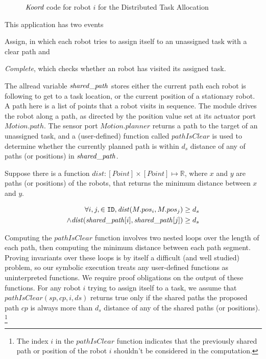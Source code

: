 \begin{figure}[t]
    {
    
    }
    {
    
    }
    \caption{ $\emph{Koord}$ code for robot $i$ for the Distributed Task Allocation}
    \label{fig:taskapp }
\end{figure}


This application has two events \begin{inparaenum} \item {Assign}, in which each robot tries to assign itself to an unassigned task with a clear path  and \item \emph{Complete}, which checks whether an robot has visited its assigned task. \end{inparaenum} The allread variable $\mathit{shared\_path}$ stores either the current path each robot is following to get to a task location, or the current position of a stationary robot. A path here is a list of points that a robot visits in sequence. The \Motion module drives the robot along a path, as directed by the position value set at its actuator port $\mathit{Motion.path}$. The sensor port $\mathit{Motion.planner}$ returns a path to the target of an unassigned task, and a (user-defined) function called $\mathit{pathIsClear}$ is used to determine whether the currently planned path is within $d_s$ distance of any of paths (or positions) in $\mathit{shared\_path}$.

\newcommand{\dist}{\mathit{dist}}
Suppose there is a function $\dist : [Point] \times [Point] \mapsto \mathbb{R}$, where $x$ and $y$ are paths (or positions) of the robots, that returns the minimum distance between $x$ and $y$.
\begin{invariant}
\label{inv:task}
\[\begin{split}
    \forall i,j, \in \UINS, \dist(M.pos_i, M.pos_j) \geq d_s \\ \land \dist(\pathvar[i], \pathvar[j]) \geq d_s
\end{split}
\]
\end{invariant}
\noindent

Computing the $\mathit{pathIsClear}$ function involves two nested loops over the length of each path, then computing the minimum distance between each path segment. Proving invariants over these loops is by itself a difficult (and well studied) problem, so our symbolic execution treats any user-defined functions as uninterpreted functions. We require proof obligations on the output of these functions. For any robot $i$ trying to assign itself to a task, we  assume that $\mathit{pathIsClear}(\mathit{sp}, \mathit{cp} ,i, \mathit{ds})$ returns true only if the shared paths the proposed path $\mathit{cp}$ is always more than $d_s$ distance of any of the shared paths (or positions). \footnote{ The index $i$ in the $\mathit{pathIsClear}$ function indicates that the previously shared path or position of the robot $i$ shouldn't be considered in the computation.}

